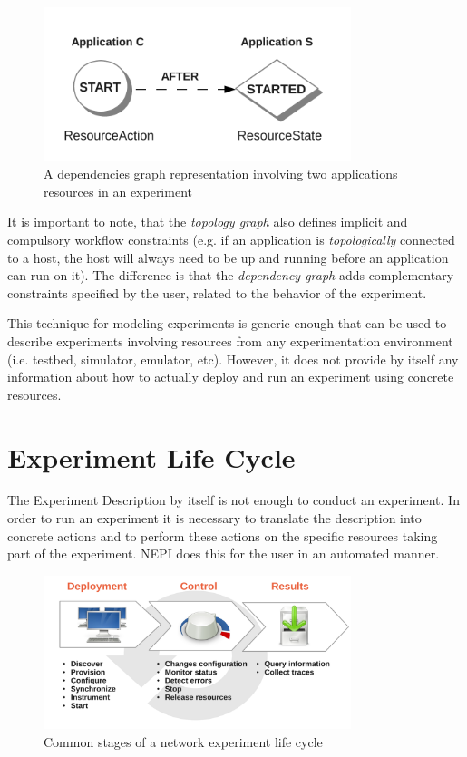 \begin{figure}[h]
  \centering
  \includegraphics[width=0.8\textwidth]{intro_dependencies_graph}
  \caption{A dependencies graph representation involving two applications 
    resources in an experiment}
  \label{fig:intro_dependencies_graph}
\end{figure}

It is important to note, that the \emph{topology graph} also defines 
implicit and compulsory workflow constraints
(e.g. if an application is \emph{topologically} connected to a host,
the host will always need to be up and running before an application 
can run on it). 
The difference is that the \emph{dependency graph} adds complementary
constraints specified by the user, related to the behavior of the 
experiment.

This technique for modeling experiments is generic enough that can be used 
to describe experiments involving resources from any experimentation 
environment (i.e. testbed, simulator, emulator, etc). However, it
does not provide by itself any information about how to actually deploy
and run an experiment using concrete resources. 


\section{Experiment Life Cycle}

The Experiment Description by itself is not enough to conduct an experiment.
In order to run an experiment it is necessary to translate the description 
into concrete actions and to perform these actions on the specific resources
taking part of the experiment. NEPI does this for the user in an automated
manner.

\begin{figure}[h]
  \centering
  \includegraphics[width=0.8\textwidth]{intro_life_cycle}
  \caption{Common stages of a network experiment life cycle}
  \label{fig:intro_life_cycle}
\end{figure}

